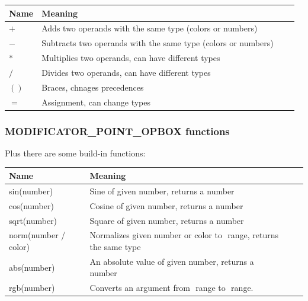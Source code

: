 \documentclass[9pt]{article}
\begin{document}
\begin{center}
\begin{tabular}{|l||l||l||l|}
\hline
Name & Meaning \\
\hline
\hline
\begin{math}+\end{math} & Adds two operands with the same type (colors or numbers) \\
\begin{math}-\end{math} & Subtracts two operands with the same type (colors or numbers) \\
\begin{math}*\end{math} & Multiplies two operands, can have different types \\
\begin{math}/\end{math} & Divides two operands, can have different types \\
\begin{math}()\end{math} & Braces, chnages precedences \\
\begin{math}=\end{math} & Assignment, can change types  \\
\hline
\end{tabular}
\end{center}

\subsubsection*{MODIFICATOR\_POINT\_OPBOX functions}

Plus there are some build-in functions:

\begin{center}
\begin{tabular}{|l||l||l||l|}
\hline
Name & Meaning \\
\hline
\hline
sin(number) & Sine of given number, returns a number \\ 
cos(number) & Cosine of given number, returns a number \\ 
sqrt(number) & Square of given number, returns a number \\ 
norm(number / color) & Normalizes given number or color to \begin{math}<0,1>\end{math} range, 
returns the same type \\ 
abs(number) & An absolute value of given number, returns a number \\ 
rgb(number) & Converts an argument from \begin{math}<0,255>\end{math} range to \begin{math}<0,1>\end{math} range. \\
\hline
\end{tabular}
\end{center}
\end{document}
